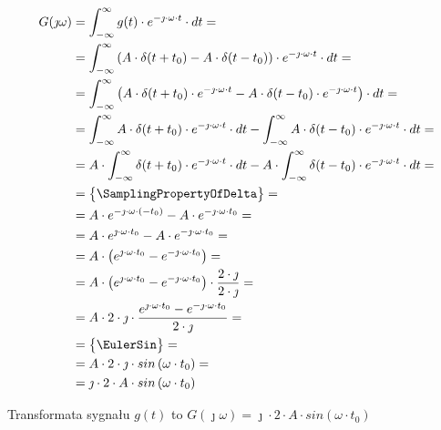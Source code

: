 \begin{task}
\begin{align*}
G(\jmath \omega )&=\int_{-\infty }^{\infty}g(t) \cdot e^{-\jmath \cdot \omega \cdot t}\cdot dt=\\
&=\int_{-\infty }^{\infty}\left( A \cdot \delta(t+t_0) - A \cdot \delta(t-t_0) \right) \cdot e^{-\jmath \cdot \omega \cdot t}\cdot dt=\\
&=\int_{-\infty }^{\infty}\left( A \cdot \delta(t+t_0)\cdot e^{-\jmath \cdot \omega \cdot t} - A \cdot \delta(t-t_0)\cdot e^{-\jmath \cdot \omega \cdot t} \right) \cdot dt=\\
&=\int_{-\infty }^{\infty} A \cdot \delta(t+t_0)\cdot e^{-\jmath \cdot \omega \cdot t}\cdot dt - \int_{-\infty }^{\infty} A \cdot \delta(t-t_0)\cdot e^{-\jmath \cdot \omega \cdot t} \cdot dt=\\
&= A \cdot \int_{-\infty }^{\infty} \delta(t+t_0)\cdot e^{-\jmath \cdot \omega \cdot t}\cdot dt - A \cdot \int_{-\infty }^{\infty}  \delta(t-t_0)\cdot e^{-\jmath \cdot \omega \cdot t} \cdot dt=\\
&=\begin{Bmatrix}
\SamplingPropertyOfDelta
\end{Bmatrix}=\\
&= A \cdot e^{-\jmath \cdot \omega \cdot (-t_0)} - A \cdot e^{-\jmath \cdot \omega \cdot t_0}=\\
&= A \cdot e^{\jmath \cdot \omega \cdot t_0} - A \cdot e^{-\jmath \cdot \omega \cdot t_0}=\\
&= A \cdot \left(e^{\jmath \cdot \omega \cdot t_0} - e^{-\jmath \cdot \omega \cdot t_0}\right)=\\
&= A \cdot \left(e^{\jmath \cdot \omega \cdot t_0} - e^{-\jmath \cdot \omega \cdot t_0}\right) \cdot \frac{2\cdot \jmath}{2\cdot \jmath}=\\
&= A \cdot 2\cdot \jmath \cdot \frac{e^{\jmath \cdot \omega \cdot t_0} - e^{-\jmath \cdot \omega \cdot t_0}}{2\cdot \jmath}=\\
&=\begin{Bmatrix}
\EulerSin
\end{Bmatrix}=\\
&= A \cdot 2\cdot \jmath \cdot sin\left( \omega \cdot t_0\right)=\\
&= \jmath \cdot 2 \cdot A \cdot sin\left( \omega \cdot t_0\right)
\end{align*}

Transformata sygnału $g(t)$ to $G(\jmath \omega)=\jmath \cdot 2 \cdot A \cdot sin\left( \omega \cdot t_0\right)$
\\


\end{task}
